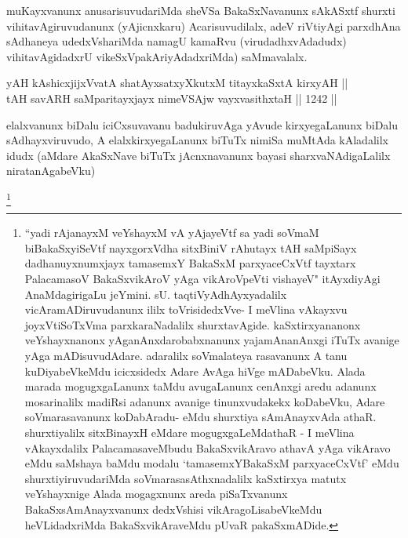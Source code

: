 \begin{artha}
muKayxvanunx anusarisuvudariMda sheVSa BakaSxNavanunx sAkASxtf shurxti vihitavAgiruvudanunx (yAjicnxkaru) Acarisuvudilalx, adeV riVtiyAgi parxdhAna sAdhaneya udedxVshariMda namagU kamaRvu (virudadhxvAdadudx) vihitavAgidadxrU vikeSxVpakAriyAdadxriMda) saMmavalalx.
\end{artha}


\begin{shl}
yAH kAshicxjijxVvatA shatAyxsatxyXkutxM titayxkaSxtA kirxyAH || \\
tAH savARH saMparitayxjayx nimeVSAjw vayxvasithxtaH \hfill || 1242 ||  
\end{shl}

\begin{artha}
elalxvanunx biDalu iciCxsuvavanu badukiruvAga yAvude kirxyegaLanunx biDalu sAdhayxviruvudo, A elalxkirxyegaLanunx biTuTx nimiSa muMtAda kAladalilx idudx (aMdare AkaSxNave biTuTx jAcnxnavanunx bayasi sharxvaNAdigaLalilx niratanAgabeVku)
\end{artha}

\begin{artha}
\footnote{``yadi rAjanayxM veYshayxM vA yAjayeVtf sa yadi soVmaM biBakaSxyiSeVtf nayxgorxVdha sitxBiniV rAhutayx tAH saMpiSayx dadhanuyxnumxjayx tamasemxY BakaSxM parxyaceCxVtf tayxtarx PalacamasoV BakaSxvikAroV yAga vikAroVpeVti vishayeV" itAyxdiyAgi AnaMdagirigaLu jeYmini. sU. taqtiVyAdhAyxyadalilx vicAramADiruvudanunx ililx toVrisidedxVve- I meVlina vAkayxvu joyxVtiSoTxVma parxkaraNadalilx shurxtavAgide. kaSxtirxyananonx veYshayxnanonx yAganAnxdarobabxnanunx yajamAnanAnxgi iTuTx avanige yAga mADisuvudAdare. adaralilx soVmalateya rasavanunx A tanu kuDiyabeVkeMdu icicxsidedx Adare AvAga hiVge mADabeVku. Alada marada mogugxgaLanunx taMdu avugaLanunx cenAnxgi aredu adanunx mosarinalilx madiRsi adanunx avanige tinunxvudakekx koDabeVku, Adare soVmarasavanunx koDabAradu- eMdu shurxtiya sAmAnayxvAda athaR. shurxtiyalilx sitxBinayxH eMdare mogugxgaLeMdathaR - I meVlina vAkayxdalilx PalacamasaveMbudu BakaSxvikAravo athavA yAga vikAravo eMdu saMshaya baMdu modalu `tamasemxYBakaSxM parxyaceCxVtf' eMdu shurxtiyiruvudariMda soVmarasasAthxnadalilx kaSxtirxya matutx veYshayxnige Alada mogagxnunx areda piSaTxvanunx BakaSxsAmAnayxvanunx dedxVshisi vikAragoLisabeVkeMdu heVLidadxriMda BakaSxvikAraveMdu pUvaR pakaSxmADide.}
\end{artha}


